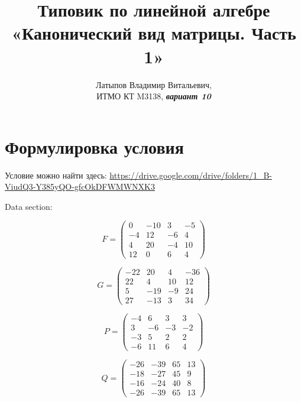 \documentclass[12pt, a4paper]{article}
\author{Латыпов Владимир Витальевич, \\ ИТМО КТ M3138, \Huge{\textit{\textbf{вариант 10}}}}
\title{Типовик по линейной алгебре «Канонический вид матрицы. Часть 1»}
\begin{document}
    \tit

    \section{Формулировка условия}

    \begin{statement}
        Условие можно найти здесь: \url{https://drive.google.com/drive/folders/1_B-ViudQ3-Y385yQO-gfcOkDFWMWNXK3}

        Data section:

        \begin{equation}
            F = \left(\begin{matrix}
                0 & -10 & 3 & -5 \\
                -4 & 12 & -6 & 4 \\
                4 & 20 & -4 & 10 \\
                12 & 0 & 6 & 4
            \end{matrix}\right)
        \end{equation}

        \begin{equation}
            G = \left(\begin{matrix}
                -22 & 20 & 4 & -36 \\
                22 & 4 & 10 & 12 \\
                5 & -19 & -9 & 24 \\
                27 & -13 & 3 & 34
            \end{matrix}\right)
        \end{equation}

        \begin{equation}
            P = \left(\begin{matrix}
                -4 & 6 & 3 & 3 \\
                3 & -6 & -3 & -2 \\
                -3 & 5 & 2 & 2 \\
                -6 & 11 & 6 & 4
            \end{matrix}\right)
        \end{equation}

        \begin{equation}
            Q = \left(\begin{matrix}
                -26 & -39 & 65 & 13 \\
                -18 & -27 & 45 & 9 \\
                -16 & -24 & 40 & 8 \\
                -26 & -39 & 65 & 13
            \end{matrix}\right)
        \end{equation}


\end{statement}
\end{document}
